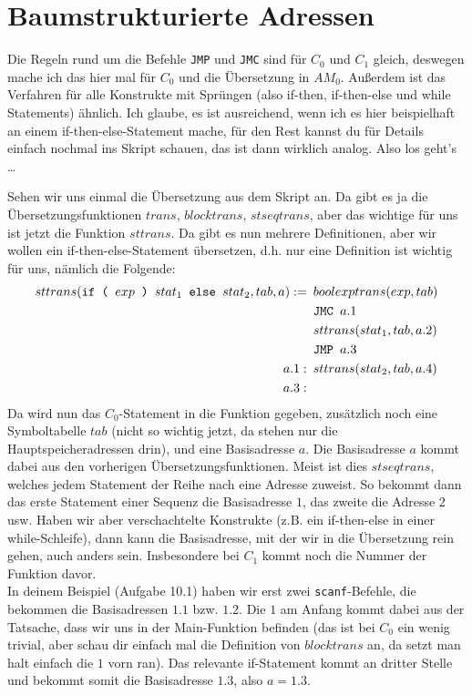 \documentclass[ngerman,a4paper, 12pt]{article}
\begin{document}
	
	\section*{Baumstrukturierte Adressen}
	
	Die Regeln rund um die Befehle \texttt{JMP} und \texttt{JMC} sind für $C_0$ und $C_1$ gleich, deswegen mache ich das hier mal für $C_0$ und die Übersetzung in $AM_0$. Außerdem ist das Verfahren für alle Konstrukte mit Sprüngen (also if-then, if-then-else und while Statements) ähnlich. Ich glaube, es ist ausreichend, wenn ich es hier beispielhaft an einem if-then-else-Statement mache, für den Rest kannst du für Details einfach nochmal ins Skript schauen, das ist dann wirklich analog. Also los geht's \dots
	
	Sehen wir uns einmal die Übersetzung aus dem Skript an. Da gibt es ja die Übersetzungs\-funktionen $trans$, $blocktrans$, $stseqtrans$, aber das wichtige für uns ist jetzt die Funktion $sttrans$. Da gibt es nun mehrere Definitionen, aber wir wollen ein if-then-else-Statement übersetzen, d.h. nur eine Definition ist wichtig für uns, nämlich die Folgende:
	\begin{equation*}
		\begin{aligned}
		sttrans(\texttt{if ( } exp \texttt{ ) } stat_1 \texttt{ else } stat_2, tab, a) := \enskip &boolexptrans(exp, tab) \\ & \texttt{JMC } a.1 \\ & sttrans(stat_1, tab, a.2) \\ & \texttt{JMP } a.3 \\ a.1: \enskip & sttrans(stat_2, tab, a.4) \\ a.3: \enskip &
		\end{aligned}
	\end{equation*}
	Da wird nun das $C_0$-Statement in die Funktion gegeben, zusätzlich noch eine Symboltabelle $tab$ (nicht so wichtig jetzt, da stehen nur die Hauptspeicheradressen drin), und eine Basisadresse $a$. 
	Die Basisadresse $a$ kommt dabei aus den vorherigen Übersetzungsfunktionen. Meist ist dies $stseqtrans$, welches jedem Statement der Reihe nach eine Adresse zuweist. So bekommt dann das erste Statement einer Sequenz die Basisadresse $1$, das zweite die Adresse $2$ usw. Haben wir aber verschachtelte Konstrukte (z.B. ein if-then-else in einer while-Schleife), dann kann die Basisadresse, mit der wir in die Übersetzung rein gehen, auch anders sein. Insbesondere bei $C_1$ kommt noch die Nummer der Funktion davor. \\
	In deinem Beispiel (Aufgabe 10.1) haben wir erst zwei \texttt{scanf}-Befehle, die bekommen die Basisadressen $1.1$ bzw. $1.2$. Die $1$ am Anfang kommt dabei aus der Tatsache, dass wir uns in der Main-Funktion befinden (das ist bei $C_0$ ein wenig trivial, aber schau dir einfach mal die Definition von $blocktrans$ an, da setzt man halt einfach die $1$ vorn ran). Das relevante if-Statement kommt an dritter Stelle und bekommt somit die Basisadresse $1.3$, also $a = 1.3$. 
	
\end{document}
